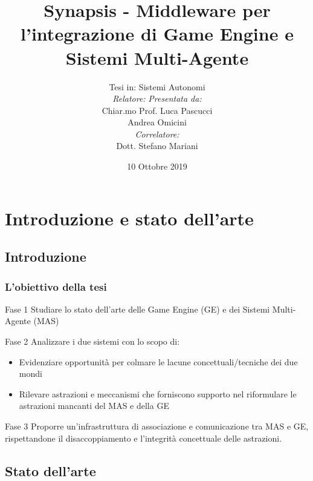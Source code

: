 \documentclass[handout]{beamer}\mode<presentation>{\usetheme{AMSCesenaBleu}}
\title[Synapsis: Middleware per GE e MAS]{Synapsis - Middleware per l'integrazione di Game Engine e Sistemi Multi-Agente}
\author[Luca Pascucci]{Tesi in: Sistemi Autonomi\\[0.5cm]\textit{Relatore:} \hspace{6cm} \textit{Presentata da:} \\ Chiar.mo Prof. \hspace{4.40cm} Luca Pascucci\\ Andrea Omicini \hspace{7.2cm} \phantom{g} \\\textit{Correlatore:} \hspace{7.75cm} \phantom{g}\\Dott. Stefano Mariani \hspace{6.1cm} \phantom{g}}
\institute[]{
\textsc{Alma Mater Studiorum} -- Università di Bologna \\
Campus di Cesena}
\date{10 Ottobre 2019}
\begin{document}
\maketitle



\section{Introduzione e stato dell'arte}

\subsection{Introduzione}

\begin{frame}
\frametitle[Introduzione e stato dell'arte]{L'obiettivo della tesi}
\begin{block}{Fase 1}
Studiare lo stato dell'arte delle Game Engine (GE) e dei Sistemi Multi-Agente (MAS)
\end{block}
\begin{block}{Fase 2}
Analizzare i due sistemi con lo scopo di:
\begin{itemize}
    \item Evidenziare opportunità per colmare le lacune concettuali/tecniche dei due mondi
    \item Rilevare astrazioni e meccanismi che forniscono supporto nel riformulare le astrazioni mancanti del MAS e della GE
\end{itemize}
\end{block}
\begin{block}{Fase 3}
Proporre un’infrastruttura di associazione e comunicazione tra MAS e GE, rispettandone il disaccoppiamento e l’integrità concettuale delle astrazioni.
\end{block}
\end{frame}

\subsection{Stato dell'arte}
\end{document}
